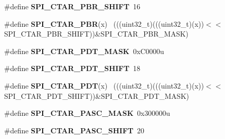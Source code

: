 \begin{DoxyCompactItemize}
\item 
\hypertarget{group___s_p_i___register___masks_gaf53f764d59da1c7a68c9185a71dfec66}{}\#define {\bfseries S\+P\+I\+\_\+\+C\+T\+A\+R\+\_\+\+P\+B\+R\+\_\+\+S\+H\+I\+F\+T}~16\label{group___s_p_i___register___masks_gaf53f764d59da1c7a68c9185a71dfec66}

\item 
\hypertarget{group___s_p_i___register___masks_gaf42de6772eb7b71709130412e9926de7}{}\#define {\bfseries S\+P\+I\+\_\+\+C\+T\+A\+R\+\_\+\+P\+B\+R}(x)                                                ~(((uint32\+\_\+t)(((uint32\+\_\+t)(x))$<$$<$S\+P\+I\+\_\+\+C\+T\+A\+R\+\_\+\+P\+B\+R\+\_\+\+S\+H\+I\+F\+T))\&S\+P\+I\+\_\+\+C\+T\+A\+R\+\_\+\+P\+B\+R\+\_\+\+M\+A\+S\+K)\label{group___s_p_i___register___masks_gaf42de6772eb7b71709130412e9926de7}

\item 
\hypertarget{group___s_p_i___register___masks_ga3680f8dc0308705f06e234914edfa14b}{}\#define {\bfseries S\+P\+I\+\_\+\+C\+T\+A\+R\+\_\+\+P\+D\+T\+\_\+\+M\+A\+S\+K}~0x\+C0000u\label{group___s_p_i___register___masks_ga3680f8dc0308705f06e234914edfa14b}

\item 
\hypertarget{group___s_p_i___register___masks_ga4201dd4e39a23f36fc01eb3f74b7c094}{}\#define {\bfseries S\+P\+I\+\_\+\+C\+T\+A\+R\+\_\+\+P\+D\+T\+\_\+\+S\+H\+I\+F\+T}~18\label{group___s_p_i___register___masks_ga4201dd4e39a23f36fc01eb3f74b7c094}

\item 
\hypertarget{group___s_p_i___register___masks_ga82d7181aa31c2d4fde7cbfecca2af39c}{}\#define {\bfseries S\+P\+I\+\_\+\+C\+T\+A\+R\+\_\+\+P\+D\+T}(x)                                                ~(((uint32\+\_\+t)(((uint32\+\_\+t)(x))$<$$<$S\+P\+I\+\_\+\+C\+T\+A\+R\+\_\+\+P\+D\+T\+\_\+\+S\+H\+I\+F\+T))\&S\+P\+I\+\_\+\+C\+T\+A\+R\+\_\+\+P\+D\+T\+\_\+\+M\+A\+S\+K)\label{group___s_p_i___register___masks_ga82d7181aa31c2d4fde7cbfecca2af39c}

\item 
\hypertarget{group___s_p_i___register___masks_ga3e9fd2ca2e90b6c40db0d51c8d8baa84}{}\#define {\bfseries S\+P\+I\+\_\+\+C\+T\+A\+R\+\_\+\+P\+A\+S\+C\+\_\+\+M\+A\+S\+K}~0x300000u\label{group___s_p_i___register___masks_ga3e9fd2ca2e90b6c40db0d51c8d8baa84}

\item 
\hypertarget{group___s_p_i___register___masks_ga7883643ad4e73cc46c7a140375a2be7a}{}\#define {\bfseries S\+P\+I\+\_\+\+C\+T\+A\+R\+\_\+\+P\+A\+S\+C\+\_\+\+S\+H\+I\+F\+T}~20\label{group___s_p_i___register___masks_ga7883643ad4e73cc46c7a140375a2be7a}


\end{DoxyCompactItemize}
